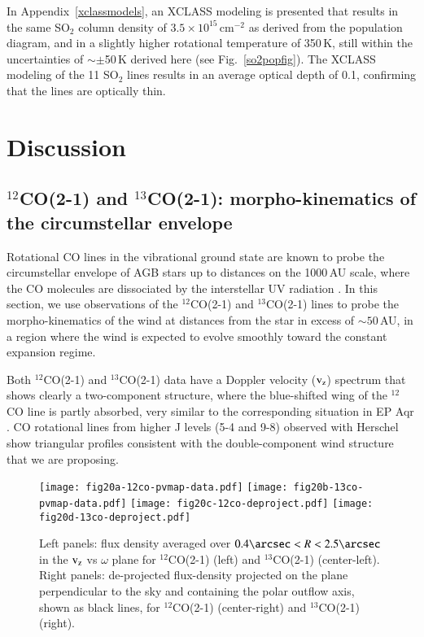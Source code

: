 \documentclass{aa}
\begin{document}
In Appendix~\ref{xclassmodels}, an XCLASS modeling is presented that
results in the same SO$_2$ column density of
$3.5\times10^{15}$\,cm$^{-2}$ as derived from the population diagram,
and in a slightly higher rotational temperature of 350\,K, still
within the uncertainties {of $\sim\pm$50\,K} derived here (see
Fig.~\ref{so2popfig}). The XCLASS modeling of the 11 SO$_2$ lines
results in an average optical depth of 0.1, confirming that the lines
are optically thin.

\section{Discussion}\label{discusec}

\subsection{$^{12}$CO(2-1) and $^{13}$CO(2-1): morpho-kinematics of 
  the circumstellar envelope}\label{cokinesec}

Rotational CO lines in the vibrational ground state are known to probe
the circumstellar envelope of AGB stars up to distances on the
1000\,AU scale, where the CO molecules are dissociated by the
interstellar UV radiation \citep{mgh88}.  In this section, we use
observations of the $^{12}$CO(2-1) and $^{13}$CO(2-1) lines to probe
the morpho-kinematics of the wind at distances from the star in excess
of $\sim 50$\,AU, in a region where the wind is expected to evolve
smoothly toward the constant expansion regime.
  
Both $^{12}$CO(2-1) and $^{13}$CO(2-1) data have a Doppler velocity
(${\rm v_z}$) spectrum that shows clearly a two-component structure,
where the blue-shifted wing of the $^{12}$CO line is partly absorbed,
very similar to the corresponding situation in EP Aqr
\citep{thnetal2019}.  CO rotational lines from higher J levels (5-4
and 9-8) observed with  Herschel \citep{dtjetal2015} show triangular
profiles consistent with the double-component wind structure that we
are proposing.

\begin{figure*}
  \centering
  \texttt{[image: fig20a-12co-pvmap-data.pdf]}
  \texttt{[image: fig20b-13co-pvmap-data.pdf]}
  \texttt{[image: fig20c-12co-deproject.pdf]}
  \texttt{[image: fig20d-13co-deproject.pdf]}
  \caption{Left panels: flux density averaged over
    $0.4\arcsec<R<2.5\arcsec$ in the ${\rm v_z}$  vs $\omega$ plane for
    $^{12}$CO(2-1) (left) and $^{13}$CO(2-1) (center-left).
    Right panels: de-projected flux-density projected on
    the plane perpendicular to the sky and containing the polar outflow
    axis, shown as black lines, for $^{12}$CO(2-1) (center-right)
    and $^{13}$CO(2-1) (right).}
    \label{COomegdeproj}
\end{figure*}
\end{document}

